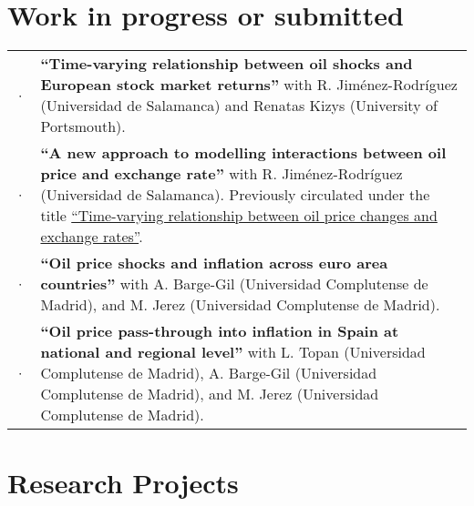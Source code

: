 \documentclass[11pt]{article}\usepackage[]{graphicx}\usepackage[]{color}
\begin{document}
\clearpage

\section{Work in progress or submitted}

\begin{tabular}{R{0.1cm} L{14cm}}

· & \textbf{``Time-varying relationship between oil shocks and European stock market returns''} with R. Jiménez-Rodríguez (Universidad de Salamanca) and Renatas Kizys (University of Portsmouth).\\[.2cm]

· & \textbf{``A new approach to modelling interactions between oil price and exchange rate''} with R. Jiménez-Rodríguez (Universidad de Salamanca). Previously circulated under the title \underline{``Time-varying relationship between oil price changes and exchange rates''}.\\[.2cm]

· & \textbf{``Oil price shocks and inflation across euro area countries''} with A. Barge-Gil (Universidad Complutense de Madrid), and M. Jerez (Universidad Complutense de Madrid).\\[.2cm]

· & \textbf{``Oil price pass-through into inflation in Spain at national and regional level''} with L. Topan (Universidad Complutense de Madrid), A. Barge-Gil (Universidad Complutense de Madrid), and M. Jerez (Universidad Complutense de Madrid).\\

\end{tabular}

\section{Research Projects}
\end{document}

